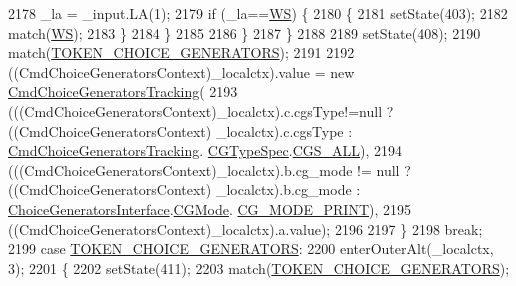 \begin{DoxyCode}
2178           \_la = \_input.LA(1);
2179           \textcolor{keywordflow}{if} (\_la==\hyperlink{classgov_1_1nasa_1_1jpf_1_1inspector_1_1client_1_1parser_1_1_console_grammar_parser_a6914a3a3adbc350b12a7df9d1b24abf1}{WS}) \{
2180             \{
2181             setState(403);
2182             match(\hyperlink{classgov_1_1nasa_1_1jpf_1_1inspector_1_1client_1_1parser_1_1_console_grammar_parser_a6914a3a3adbc350b12a7df9d1b24abf1}{WS});
2183             \}
2184           \}
2185 
2186           \}
2187         \}
2188 
2189         setState(408);
2190         match(\hyperlink{classgov_1_1nasa_1_1jpf_1_1inspector_1_1client_1_1parser_1_1_console_grammar_parser_abc82b513c43997c7369162a20cb4887b}{TOKEN\_CHOICE\_GENERATORS});
2191 
2192               ((CmdChoiceGeneratorsContext)\_localctx).value =  \textcolor{keyword}{new} 
      \hyperlink{classgov_1_1nasa_1_1jpf_1_1inspector_1_1client_1_1commands_1_1_cmd_choice_generators_tracking}{CmdChoiceGeneratorsTracking}(
2193               (((CmdChoiceGeneratorsContext)\_localctx).c.cgsType!=null ? ((CmdChoiceGeneratorsContext)
      \_localctx).c.cgsType : \hyperlink{classgov_1_1nasa_1_1jpf_1_1inspector_1_1client_1_1commands_1_1_cmd_choice_generators_tracking}{CmdChoiceGeneratorsTracking}.
      \hyperlink{enumgov_1_1nasa_1_1jpf_1_1inspector_1_1client_1_1commands_1_1_cmd_choice_generators_tracking_1_1_c_g_type_spec}{CGTypeSpec}.\hyperlink{enumgov_1_1nasa_1_1jpf_1_1inspector_1_1client_1_1commands_1_1_cmd_choice_generators_tracking_1_1_c_g_type_spec_abb58d4a840a0a78d5ef028cf1326145d}{CGS\_ALL}),
2194               (((CmdChoiceGeneratorsContext)\_localctx).b.cg\_mode != null ? ((CmdChoiceGeneratorsContext)
      \_localctx).b.cg\_mode : \hyperlink{interfacegov_1_1nasa_1_1jpf_1_1inspector_1_1interfaces_1_1_choice_generators_interface}{ChoiceGeneratorsInterface}.\hyperlink{enumgov_1_1nasa_1_1jpf_1_1inspector_1_1interfaces_1_1_choice_generators_interface_1_1_c_g_mode}{CGMode}.
      \hyperlink{enumgov_1_1nasa_1_1jpf_1_1inspector_1_1interfaces_1_1_choice_generators_interface_1_1_c_g_mode_aa57768ae6f1c100e6b2acbf7abe3aa7d}{CG\_MODE\_PRINT}),
2195               ((CmdChoiceGeneratorsContext)\_localctx).a.value);
2196               
2197         \}
2198         \textcolor{keywordflow}{break};
2199       \textcolor{keywordflow}{case} \hyperlink{classgov_1_1nasa_1_1jpf_1_1inspector_1_1client_1_1parser_1_1_console_grammar_parser_abc82b513c43997c7369162a20cb4887b}{TOKEN\_CHOICE\_GENERATORS}:
2200         enterOuterAlt(\_localctx, 3);
2201         \{
2202         setState(411);
2203         match(\hyperlink{classgov_1_1nasa_1_1jpf_1_1inspector_1_1client_1_1parser_1_1_console_grammar_parser_abc82b513c43997c7369162a20cb4887b}{TOKEN\_CHOICE\_GENERATORS});

\end{DoxyCode}
